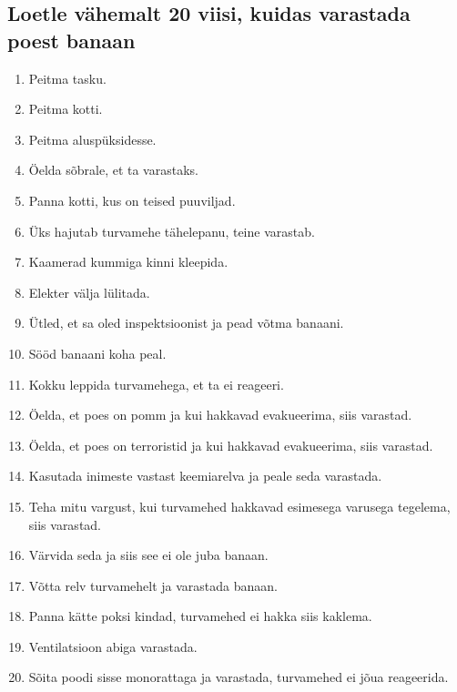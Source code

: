 \documentclass{article}
\begin{document}
\begin{enumerate}
\section{Loetle vähemalt 20 viisi, kuidas varastada poest banaan}
\begin{enumerate}
	\item{Peitma tasku.}
	\item{Peitma kotti.}
	\item{Peitma aluspüksidesse.}
	\item{Öelda sõbrale, et ta varastaks.}
	\item{Panna kotti, kus on teised puuviljad.}
	\item{Üks hajutab turvamehe tähelepanu, teine varastab.}
	\item{Kaamerad kummiga kinni kleepida.}
	\item{Elekter välja lülitada.}
	\item{Ütled, et sa oled inspektsioonist ja pead võtma banaani.}
	\item{Sööd banaani koha peal.}
	\item{Kokku leppida turvamehega, et ta ei reageeri.}
	\item{Öelda, et poes on pomm ja kui hakkavad evakueerima, siis varastad.}
	\item{Öelda, et poes on terroristid ja kui hakkavad evakueerima, siis varastad.}
	\item{Kasutada inimeste vastast keemiarelva ja peale seda varastada.}
	\item{Teha mitu vargust, kui turvamehed hakkavad esimesega varusega tegelema, siis varastad.}
	\item{Värvida seda ja siis see ei ole juba banaan.}
	\item{Võtta relv turvamehelt ja varastada banaan.}
	\item{Panna kätte poksi kindad, turvamehed ei hakka siis kaklema.}
	\item{Ventilatsioon abiga varastada.}
	\item{Sõita poodi sisse monorattaga ja varastada, turvamehed ei jõua reageerida.}
\end{enumerate}


\end{enumerate}
\end{document}
